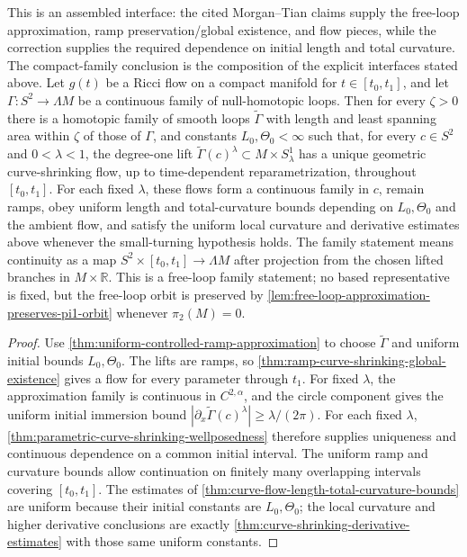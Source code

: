 \begin{theorem}
\label{thm:controlled-curve-shrinking-existence}
\notready
This is an assembled interface: the cited Morgan--Tian claims supply the
free-loop approximation, ramp preservation/global existence, and flow pieces,
while the correction supplies the required dependence on initial length and
total curvature.  The compact-family conclusion is the composition of the
explicit interfaces stated above.
Let $g(t)$ be a Ricci flow on a compact manifold for
$t\in[t_0,t_1]$, and let
$\Gamma\colon S^2\to\Lambda M$ be a continuous family of null-homotopic
loops.  Then for every $\zeta>0$ there is a homotopic family of smooth loops
$\widetilde\Gamma$ with length and least spanning area within $\zeta$ of
those of $\Gamma$, and constants $L_0,\Theta_0<\infty$ such that, for every
$c\in S^2$ and $0<\lambda<1$, the degree-one lift
$\widetilde\Gamma(c)^\lambda\subset M\times S^1_\lambda$ has a unique
geometric curve-shrinking flow, up to time-dependent reparametrization,
throughout $[t_0,t_1]$.  For each fixed $\lambda$, these flows form a
continuous family in $c$, remain ramps, obey uniform length and
total-curvature bounds depending
on $L_0,\Theta_0$ and the ambient flow, and satisfy the uniform local
curvature and derivative estimates above whenever the small-turning
hypothesis holds.
The family statement means continuity as a map
$S^2\times[t_0,t_1]\to\Lambda M$ after projection from the chosen lifted
branches in $M\times\mathbb R$.  This is a free-loop family statement; no
based representative is fixed, but the free-loop orbit is preserved by
\ref{lem:free-loop-approximation-preserves-pi1-orbit} whenever
$\pi_2(M)=0$.
\end{theorem}

\begin{proof}
Use \ref{thm:uniform-controlled-ramp-approximation} to choose
$\widetilde\Gamma$ and uniform initial bounds $L_0,\Theta_0$.  The lifts are
ramps, so \ref{thm:ramp-curve-shrinking-global-existence} gives a flow for
every parameter through $t_1$.  For fixed $\lambda$, the approximation family
is continuous in $C^{2,\alpha}$, and the circle component gives the uniform
initial immersion bound $|\partial_x\widetilde\Gamma(c)^\lambda|
\ge\lambda/(2\pi)$.  For each fixed $\lambda$,
\ref{thm:parametric-curve-shrinking-wellposedness} therefore supplies
uniqueness and continuous dependence on a common initial interval.  The
uniform ramp and curvature bounds allow continuation on
finitely many overlapping intervals covering $[t_0,t_1]$.  The estimates of
\ref{thm:curve-flow-length-total-curvature-bounds} are uniform because their
initial constants are $L_0,\Theta_0$; the local curvature and higher
derivative conclusions are exactly
\ref{thm:curve-shrinking-derivative-estimates} with those same uniform
constants.
\end{proof}
